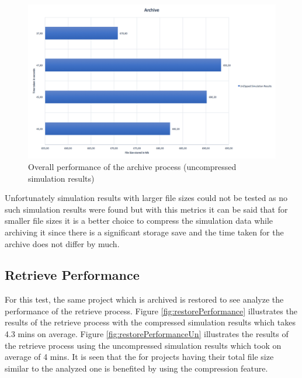 \begin{figure}[H]
    \centering \includegraphics[scale=0.5]{grafiken/archiveUnzip.png}
    \caption{Overall performance of the archive process (uncompressed simulation results)}
    \label{fig:archivePerformanceUn}
\end{figure}

Unfortunately simulation results with larger file sizes could not be tested as no such simulation results were found but with this metrics it can be said that
for smaller file sizes it is a better choice to compress the simulation data while archiving it since there is a significant storage save and the time taken for the
archive does not differ by much.   

\subsection{Retrieve Performance}
For this test, the same project which is archived is restored to see analyze the performance of the retrieve process. Figure \ref{fig:restorePerformance} illustrates
the results of the retrieve process with the compressed simulation results which takes 4.3 mins on average. Figure \ref{fig:restorePerformanceUn} illustrates the
results of the retrieve process using the uncompressed simulation results which took on average of 4 mins. It is seen that the for projects having their total file
size similar to the analyzed one is benefited by using the compression feature.

